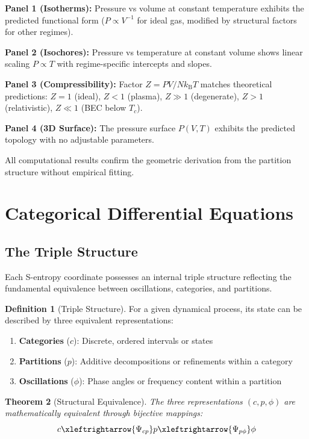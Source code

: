 \documentclass[11pt,twocolumn,a4paper]{article}
\newtheorem{theorem}{Theorem}[section]
\theoremstyle{definition}
\newtheorem{definition}[theorem]{Definition}
\theoremstyle{remark}
\newcommand{\kB}{k_{\mathrm{B}}}
\begin{document}
\textbf{Panel 1 (Isotherms):} Pressure vs volume at constant temperature exhibits the predicted functional form ($P \propto V^{-1}$ for ideal gas, modified by structural factors for other regimes).

\textbf{Panel 2 (Isochores):} Pressure vs temperature at constant volume shows linear scaling $P \propto T$ with regime-specific intercepts and slopes.

\textbf{Panel 3 (Compressibility):} Factor $Z = PV/N\kB T$ matches theoretical predictions: $Z = 1$ (ideal), $Z < 1$ (plasma), $Z \gg 1$ (degenerate), $Z > 1$ (relativistic), $Z \ll 1$ (BEC below $T_c$).

\textbf{Panel 4 (3D Surface):} The pressure surface $P(V,T)$ exhibits the predicted topology with no adjustable parameters.

All computational results confirm the geometric derivation from the partition structure without empirical fitting.

\section{Categorical Differential Equations}
\label{sec:categorical_dynamics}

\subsection{The Triple Structure}

Each S-entropy coordinate possesses an internal triple structure reflecting the fundamental equivalence between oscillations, categories, and partitions.

\begin{definition}[Triple Structure]
\label{def:triple_structure}
For a given dynamical process, its state can be described by three equivalent representations:
\begin{enumerate}[label=(\roman*)]
\item \textbf{Categories} ($c$): Discrete, ordered intervals or states
\item \textbf{Partitions} ($p$): Additive decompositions or refinements within a category
\item \textbf{Oscillations} ($\phi$): Phase angles or frequency content within a partition
\end{enumerate}
\end{definition}

\begin{theorem}[Structural Equivalence]
\label{thm:structural_equivalence}
The three representations $(c, p, \phi)$ are mathematically equivalent through bijective mappings:
\begin{equation}
c \xleftrightarrow{\Psi_{cp}} p \xleftrightarrow{\Psi_{p\phi}} \phi
\label{eq:structural_equivalence}
\end{equation}
\end{theorem}
\end{document}
